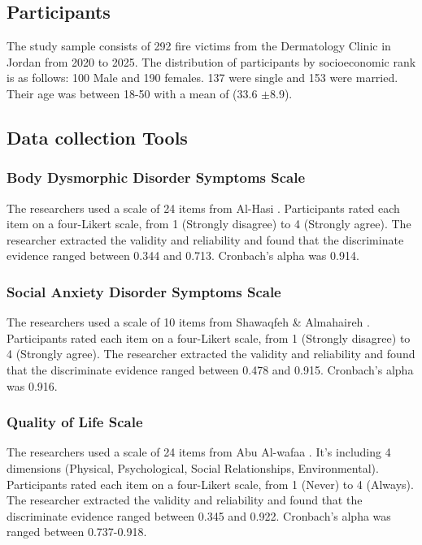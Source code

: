 \documentclass[10pt]{NSP1}
\begin{document}
	\subsection{Participants}
	The study sample consists of 292 fire victims from the Dermatology Clinic in Jordan from 2020 to 2025. The distribution of participants by socioeconomic rank is as follows: 100 Male and 190 females. 137 were single and 153 were married. Their age was between 18-50 with a mean of (33.6 $\pm$8.9).
	
	\subsection{Data collection Tools}
	
	\subsubsection{Body Dysmorphic Disorder Symptoms Scale}
	The researchers used a scale of 24 items from Al-Hasi \cite{AlHasi2023}. Participants rated each item on a four-Likert scale, from 1 (Strongly disagree) to 4 (Strongly agree). The researcher extracted the validity and reliability and found that the discriminate evidence ranged between 0.344 and 0.713. Cronbach's alpha was 0.914.
	
	\subsubsection{Social Anxiety Disorder Symptoms Scale}
	The researchers used a scale of 10 items from Shawaqfeh \& Almahaireh \cite{Shawaqfeh2022}. Participants rated each item on a four-Likert scale, from 1 (Strongly disagree) to 4 (Strongly agree). The researcher extracted the validity and reliability and found that the discriminate evidence ranged between 0.478 and 0.915. Cronbach's alpha was 0.916.
	
	\subsubsection{Quality of Life Scale}
	The researchers used a scale of 24 items from Abu Al-wafaa \cite{AbuAlwafaa2024}. It's including 4 dimensions (Physical, Psychological, Social Relationships, Environmental). Participants rated each item on a four-Likert scale, from 1 (Never) to 4 (Always). The researcher extracted the validity and reliability and found that the discriminate evidence ranged between 0.345 and 0.922. Cronbach's alpha was ranged between 0.737-0.918.
	
\end{document}
